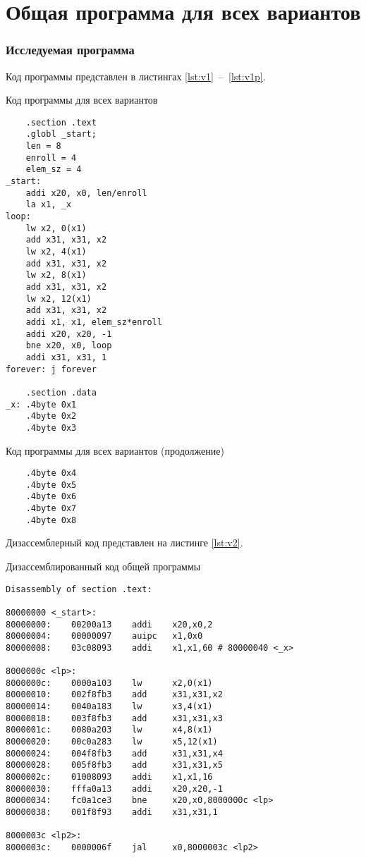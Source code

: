 \chapter*{Общая программа для всех вариантов}

\subsection*{Исследуемая программа}

Код программы представлен в листингах \ref{lst:v1}~--~\ref{lst:v1p}.

\begin{code}
\caption{Код программы для всех вариантов}
\label{lst:v1}

\begin{verbatim}
	.section .text
	.globl _start;
	len = 8 
	enroll = 4 
	elem_sz = 4 
_start:
	addi x20, x0, len/enroll
	la x1, _x
loop:	
	lw x2, 0(x1)
	add x31, x31, x2
	lw x2, 4(x1)
	add x31, x31, x2
	lw x2, 8(x1)
	add x31, x31, x2
	lw x2, 12(x1)
	add x31, x31, x2
	addi x1, x1, elem_sz*enroll
	addi x20, x20, -1
	bne x20, x0, loop
	addi x31, x31, 1
forever: j forever
	
	.section .data
_x:	.4byte 0x1
	.4byte 0x2
	.4byte 0x3
\end{verbatim}
\end{code}


\begin{code}
\caption{Код программы для всех вариантов (продолжение)}
\label{lst:v1p}

\begin{verbatim}
	.4byte 0x4
	.4byte 0x5
	.4byte 0x6
	.4byte 0x7
	.4byte 0x8
\end{verbatim}
\end{code}


Дизассемблерный код представлен на листинге \ref{lst:v2}.

\begin{code}
\caption{Дизассемблированный код общей программы}
\label{lst:v2}

\begin{verbatim}
Disassembly of section .text:

80000000 <_start>:
80000000:    00200a13    addi    x20,x0,2
80000004:    00000097    auipc   x1,0x0
80000008:    03c08093    addi    x1,x1,60 # 80000040 <_x>

8000000c <lp>:
8000000c:    0000a103    lw      x2,0(x1)
80000010:    002f8fb3    add     x31,x31,x2
80000014:    0040a183    lw      x3,4(x1)
80000018:    003f8fb3    add     x31,x31,x3
8000001c:    0080a203    lw      x4,8(x1)
80000020:    00c0a283    lw      x5,12(x1)
80000024:    004f8fb3    add     x31,x31,x4
80000028:    005f8fb3    add     x31,x31,x5
8000002c:    01008093    addi    x1,x1,16
80000030:    fffa0a13    addi    x20,x20,-1
80000034:    fc0a1ce3    bne     x20,x0,8000000c <lp>
80000038:    001f8f93    addi    x31,x31,1

8000003c <lp2>:
8000003c:    0000006f    jal     x0,8000003c <lp2>
\end{verbatim}
\end{code}

